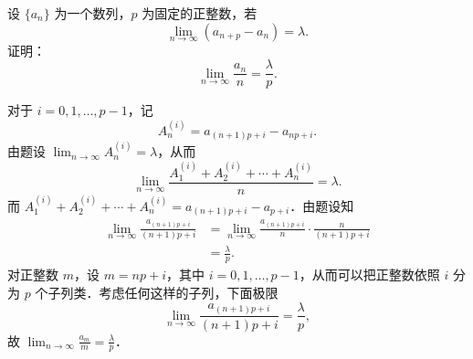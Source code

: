 设 $\{a_n\}$ 为一个数列，$p$ 为固定的正整数，若
\[
  \lim_{n\to\infty}(a_{n+p}-a_n)=\lambda.
\]
证明：
\[
  \lim_{n\to\infty}\frac{a_n}{n}=\frac{\lambda}{p}.
\]
\begin{solution}
  对于 $i=0,1,\dots,p-1$，记
  \[
    A_n^{(i)}=a_{(n+1)p+i}-a_{np+i}.
  \]
  由题设 $\displaystyle \lim_{n\to\infty}A_n^{(i)}=\lambda$，从而
  \[
    \lim_{n\to\infty}\frac{A_1^{(i)}+A_2^{(i)}+\cdots+A_n^{(i)}}{n}=\lambda.
  \]
  而 $A_1^{(i)}+A_2^{(i)}+\cdots+A_n^{(i)}=a_{(n+1)p+i}-a_{p+i}$．由题设知
  \begin{align*}
    \lim_{n\to\infty}\frac{a_{(n+1)p+i}}{(n+1)p+i}
    &=\lim_{n\to\infty}\frac{a_{(n+1)p+i}}{n}\cdot\frac{n}{(n+1)p+i}\\
    &=\frac{\lambda}{p}.
  \end{align*}
  对正整数 $m$，设 $m=np+i$，其中 $i=0,1,\dots,p-1$，从而可以把正整数依照 $i$ 分为 $p$ 个子列类．考虑任何这样的子列，下面极限
  \[
    \lim_{n\to\infty}\frac{a_{(n+1)p+i}}{(n+1)p+i}=\frac{\lambda}{p},
  \]
  故 $\displaystyle \lim_{n\to\infty}\frac{a_m}{m}=\frac{\lambda}{p}$．
\end{solution}
